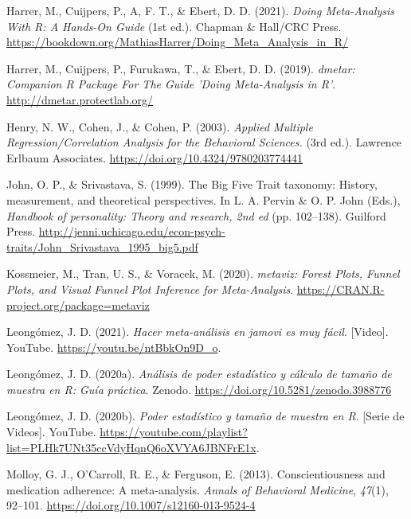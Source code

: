 \documentclass[
  bookmarksnumbered]{article}
\newlength{\cslhangindent}
\newlength{\cslentryspacingunit} %
\newenvironment{CSLReferences}[2] %
 {%
  \setlength{\parindent}{0pt}
  \ifodd #1
  \let\oldpar\par
  \def\par{\hangindent=\cslhangindent\oldpar}
  \fi
  \setlength{\parskip}{#2\cslentryspacingunit}
 }%
 {}
\begin{document}
\begin{CSLReferences}{1}{0}
\leavevmode{}%
Harrer, M., Cuijpers, P., A, F. T., \& Ebert, D. D. (2021). \emph{{Doing Meta-Analysis With {R}: A Hands-On Guide}} (1st ed.). Chapman \& Hall/CRC Press. \url{https://bookdown.org/MathiasHarrer/Doing_Meta_Analysis_in_R/}

\leavevmode{}%
Harrer, M., Cuijpers, P., Furukawa, T., \& Ebert, D. D. (2019). \emph{{dmetar: Companion R Package For The Guide 'Doing Meta-Analysis in R'}}. \url{http://dmetar.protectlab.org/}

\leavevmode{}%
Henry, N. W., Cohen, J., \& Cohen, P. (2003). \emph{Applied {Multiple Regression}/{Correlation Analysis} for the {Behavioral Sciences}.} (3rd ed.). {Lawrence Erlbaum Associates}. \url{https://doi.org/10.4324/9780203774441}

\leavevmode{}%
John, O. P., \& Srivastava, S. (1999). The {Big Five Trait} taxonomy: {History}, measurement, and theoretical perspectives. In L. A. Pervin \& O. P. John (Eds.), \emph{Handbook of personality: {Theory} and research, 2nd ed} (pp. 102--138). {Guilford Press}. \url{http://jenni.uchicago.edu/econ-psych-traits/John_Srivastava_1995_big5.pdf}

\leavevmode{}%
Kossmeier, M., Tran, U. S., \& Voracek, M. (2020). \emph{{metaviz: Forest Plots, Funnel Plots, and Visual Funnel Plot Inference for Meta-Analysis}}. \url{https://CRAN.R-project.org/package=metaviz}

\leavevmode{}%
Leongómez, J. D. (2021). \emph{Hacer meta-análisis en jamovi es muy fácil}. {[}Video{]}. YouTube. \url{https://youtu.be/ntBbkOn9D_o}.

\leavevmode{}%
Leongómez, J. D. (2020a). \emph{Análisis de poder estadístico y cálculo de tamaño de muestra en {R}: {Guía} práctica}. {Zenodo}. \url{https://doi.org/10.5281/zenodo.3988776}

\leavevmode{}%
Leongómez, J. D. (2020b). \emph{Poder estadístico y tamaño de muestra en {R}}. {[}Serie de Videos{]}. YouTube. \url{https://youtube.com/playlist?list=PLHk7UNt35ccVdyHqnQ6oXVYA6JBNFrE1x}.

\leavevmode{}%
Molloy, G. J., O'Carroll, R. E., \& Ferguson, E. (2013). Conscientiousness and medication adherence: A meta-analysis. \emph{Annals of Behavioral Medicine}, \emph{47}(1), 92--101. \url{https://doi.org/10.1007/s12160-013-9524-4}


\end{CSLReferences}
\end{document}
